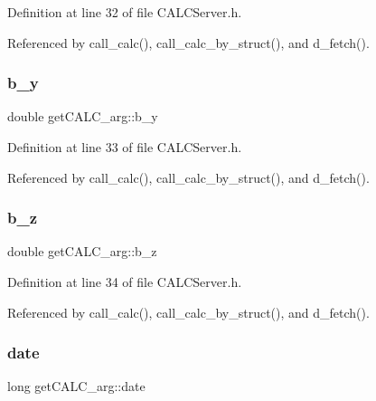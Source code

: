 Definition at line 32 of file C\+A\+L\+C\+Server.\+h.



Referenced by call\+\_\+calc(), call\+\_\+calc\+\_\+by\+\_\+struct(), and d\+\_\+fetch().

\mbox{\label{structget_c_a_l_c__arg_aa7804ceb9212f589d01e62f8e35b6583}} 
\subsubsection{\texorpdfstring{b\+\_\+y}{b\_y}}
{\footnotesize\ttfamily double get\+C\+A\+L\+C\+\_\+arg\+::b\+\_\+y}



Definition at line 33 of file C\+A\+L\+C\+Server.\+h.



Referenced by call\+\_\+calc(), call\+\_\+calc\+\_\+by\+\_\+struct(), and d\+\_\+fetch().

\mbox{\label{structget_c_a_l_c__arg_a3e774dcde57d3242b8f5dac34aa22f44}} 
\subsubsection{\texorpdfstring{b\+\_\+z}{b\_z}}
{\footnotesize\ttfamily double get\+C\+A\+L\+C\+\_\+arg\+::b\+\_\+z}



Definition at line 34 of file C\+A\+L\+C\+Server.\+h.



Referenced by call\+\_\+calc(), call\+\_\+calc\+\_\+by\+\_\+struct(), and d\+\_\+fetch().

\mbox{\label{structget_c_a_l_c__arg_a5ead419c2f01ac11a298b43c02db162c}} 
\subsubsection{\texorpdfstring{date}{date}}
{\footnotesize\ttfamily long get\+C\+A\+L\+C\+\_\+arg\+::date}



